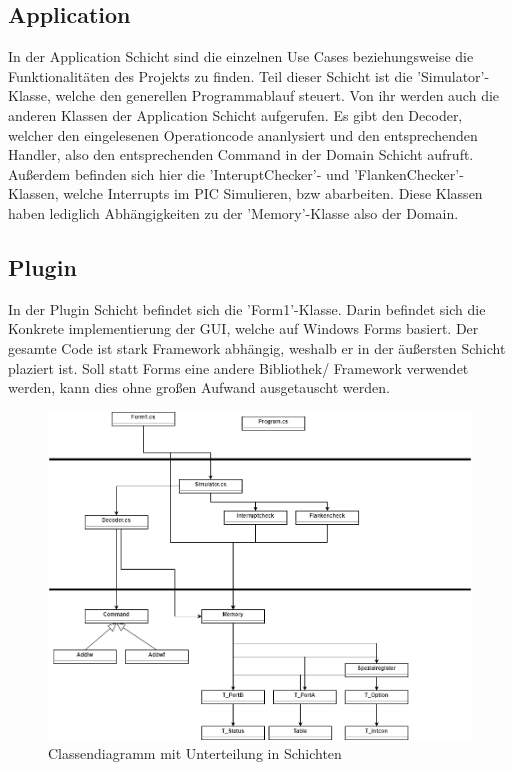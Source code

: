 \documentclass[12pt,a4paper,titlepage,ngerman,pdftex]{report}
\begin{document}
    \subsection{Application}
    In der Application Schicht sind die einzelnen Use Cases beziehungsweise die Funktionalitäten des Projekts zu finden. Teil dieser Schicht ist die 'Simulator'- Klasse, welche den generellen Programmablauf steuert. Von ihr werden auch die anderen Klassen der Application Schicht aufgerufen.
    Es gibt den Decoder, welcher den eingelesenen Operationcode ananlysiert und den entsprechenden Handler, also den entsprechenden Command in der Domain Schicht aufruft. Außerdem befinden sich hier die 'InteruptChecker'- und 'FlankenChecker'-Klassen, welche Interrupts im PIC Simulieren, bzw abarbeiten.
    Diese Klassen haben lediglich Abhängigkeiten zu der 'Memory'-Klasse also der Domain. 

    \subsection{Plugin}
    In der Plugin Schicht befindet sich die 'Form1'-Klasse. Darin befindet sich die Konkrete implementierung der GUI, welche auf Windows Forms basiert. Der gesamte Code ist stark Framework abhängig, weshalb er in der äußersten Schicht plaziert ist.
    Soll statt Forms eine andere Bibliothek/ Framework verwendet werden, kann dies ohne großen Aufwand ausgetauscht werden.
 
    \begin{figure}
        \centering
        \includegraphics[width = \linewidth]{"images/classdiagramm.png"}
        \caption{Classendiagramm mit Unterteilung in Schichten}
    \end{figure}
\end{document}
